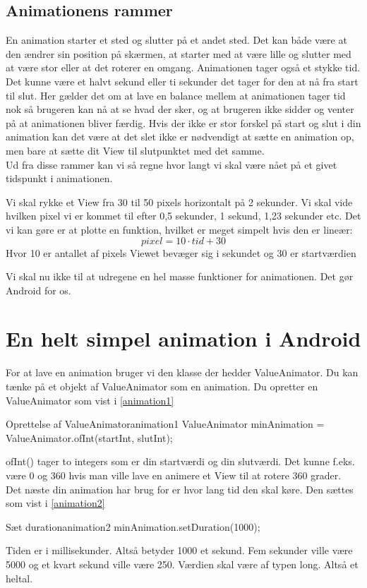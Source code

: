 \subsection{Animationens rammer}
En animation starter et sted og slutter på et andet sted. Det kan både være at den ændrer sin position på skærmen, at starter med at være lille og slutter med at være stor eller at det roterer en omgang.
Animationen tager også et stykke tid. Det kunne være et halvt sekund eller ti sekunder det tager for den at nå fra start til slut. Her gælder det om at lave en balance mellem at animationen tager tid nok så brugeren kan nå at se hvad der sker, og at brugeren ikke sidder og venter på at animationen bliver færdig. Hvis der ikke er stor forskel på start og slut i din animation kan det være at det slet ikke er nødvendigt at sætte en animation op, men bare at sætte dit View til slutpunktet med det samme.  \\
Ud fra disse rammer kan vi så regne hvor langt vi skal være nået på et givet tidspunkt i animationen. 
\begin{example}
	Vi skal rykke et View fra 30 til 50 pixels horizontalt på 2 sekunder. Vi skal vide hvilken pixel vi er kommet til efter 0,5 sekunder, 1 sekund, 1,23 sekunder etc. Det vi kan gøre er at plotte en funktion, hvilket er meget simpelt hvis den er lineær:
	\begin{equation}
	pixel=10\cdot tid+30
	\end{equation}
	Hvor 10 er antallet af pixels Viewet bevæger sig i sekundet og 30 er startværdien
\end{example}
Vi skal nu ikke til at udregene en hel masse funktioner for animationen. Det gør Android for os.
\section{En helt simpel animation i Android}
For at lave en animation bruger vi den klasse der hedder ValueAnimator. Du kan tænke på et objekt af ValueAnimator som en animation. Du opretter en ValueAnimator som vist i \autoref{animation1}
\begin{JavaCode}{Oprettelse af ValueAnimator}{animation1}
	ValueAnimator minAnimation = ValueAnimator.ofInt(startInt, slutInt);
\end{JavaCode}
ofInt() tager to integers som er din startværdi og din slutværdi. Det kunne f.eks. være 0 og 360 hvis man ville lave en animere et View til at rotere 360 grader. \\
Det næste din animation har brug for er hvor lang tid den skal køre. Den sættes som vist i \autoref{animation2}
\begin{JavaCode}{Sæt duration}{animation2}
	minAnimation.setDuration(1000);	
\end{JavaCode}
Tiden er i millisekunder. Altså betyder 1000 et sekund. Fem sekunder ville være 5000 og et kvart sekund ville være 250. Værdien skal være af typen long. Altså et heltal.
